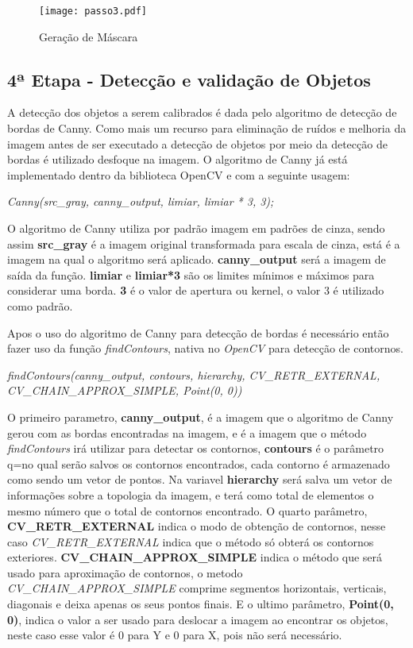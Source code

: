 \begin{figure}[H]
			\centering
			\texttt{[image: passo3.pdf]}
			\caption{Geração de Máscara}
			\label{Configuracao}
		\end{figure}		


\subsection{4ª Etapa - Detecção e validação de Objetos}
A detecção dos objetos a serem calibrados é dada pelo algoritmo de detecção de bordas de Canny. Como mais um recurso para eliminação de ruídos e melhoria da imagem antes de ser executado a detecção de objetos por meio da detecção de bordas é utilizado desfoque na imagem. O algoritmo de Canny já está implementado dentro da biblioteca OpenCV e com a seguinte usagem:
\begin{center}
\centering \textit{  Canny(src\_gray, canny\_output, limiar, limiar * 3, 3);}
\end{center}
O algoritmo de Canny utiliza por padrão imagem em padrões de cinza, sendo assim \textbf{src\_gray} é a imagem original transformada para escala de cinza, está é a imagem na qual o algoritmo será aplicado. \textbf{canny\_output} será a imagem de saída da função.
\textbf{limiar} e \textbf{limiar*3} são os limites mínimos e máximos para considerar uma borda. \textbf{3} é o valor de apertura ou kernel, o valor 3 é utilizado como padrão.

Apos o uso do algoritmo de Canny para detecção de bordas é necessário então fazer uso da função \textit{findContours}, nativa no \textit{OpenCV} para detecção de contornos.
\begin{center}
\centering \textit{ findContours(canny\_output, contours, hierarchy, CV\_RETR\_EXTERNAL, CV\_CHAIN\_APPROX\_SIMPLE, Point(0, 0))}
\end{center}

O primeiro parametro, \textbf{canny\_output}, é a imagem que o algoritmo de Canny gerou com as bordas encontradas na imagem, e é a imagem que o método \textit{findContours} irá utilizar para detectar os contornos, \textbf{contours} é o parâmetro q=no qual serão salvos os contornos encontrados, cada contorno é armazenado como sendo um vetor de pontos\cite{OpenCV}. Na variavel \textbf{hierarchy} será salva um vetor de informações sobre a topologia da imagem, e terá como total de elementos o mesmo número que o total de contornos encontrado\cite{OpenCV}. O quarto parâmetro, \textbf{CV\_RETR\_EXTERNAL} indica o modo de obtenção de contornos, nesse caso \textit{CV\_RETR\_EXTERNAL} indica que o método só obterá os contornos exteriores\cite{OpenCV}. \textbf{CV\_CHAIN\_APPROX\_SIMPLE} indica o método que será usado para aproximação de contornos, o metodo \textit{CV\_CHAIN\_APPROX\_SIMPLE} comprime segmentos horizontais, verticais, diagonais e deixa apenas os seus pontos finais\cite{OpenCV}. E o ultimo parâmetro, \textbf{Point(0, 0)}, indica o valor a ser usado para deslocar a imagem ao encontrar os objetos, neste caso esse valor é 0 para Y e 0 para X, pois não será necessário. 

